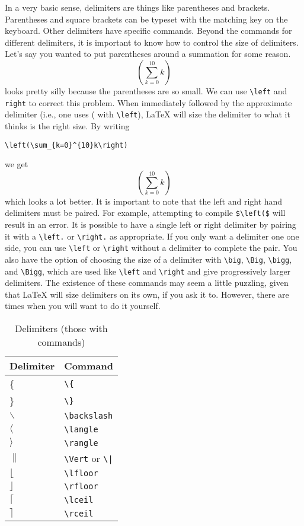 In a very basic sense, delimiters are things like parentheses and
brackets.  Parentheses and square brackets can be typeset with the
matching key on the keyboard.  Other delimiters have specific
commands.  Beyond the commands for different delimiters, it is
important to know how to control the size of delimiters.  Let's say
you wanted to put parentheses around a summation for some
reason.  \[(\sum_{k=0}^{10} k)\] looks pretty silly because the
parentheses are so small.  We can use \verb=\left= and \verb=right= to
correct this problem.  When immediately followed by the approximate
delimiter (i.e., one uses ( with \verb=\left=), \LaTeX{} will size
the delimiter to what it thinks is the right size.  By writing
\begin{verbatim}
\left(\sum_{k=0}^{10}k\right)
\end{verbatim}
we get \[\left(\sum_{k=0}^{10}k\right)\] which looks a lot better.
It is important to note that the left and right hand delimiters
must be paired.  For example, attempting to compile
\verb?$\left($? will result in an error.  It is possible to have a
single left or right delimiter by pairing it with a
\verb=\left.= or \verb=\right.= as appropriate.  If you only
want a delimiter one one side, you can use \verb=\left= or
\verb=\right= without a delimiter to complete the pair.  You
also have the option of choosing the size of a delimiter with
\verb=\big=, \verb=\Big=, \verb=\bigg=, and \verb=\Bigg=, which
are used like \verb=\left= and \verb=\right= and give
progressively larger delimiters.  The existence of these
commands may seem a little puzzling, given that \LaTeX{} will
size delimiters on its own, if you ask it to.  However, there
are times when you will want to do it yourself.
\begin{table}
  \centering
  \caption{Delimiters (those with commands)}
  \label{tab:delimiters}
  \begin{tabular}{@{}ll@{}}
    \toprule
    Delimiter & Command \\
    \midrule
    \{ & \verb=\{= \\
    \} & \verb=\}= \\
    $\backslash$ & \verb=\backslash= \\
    $\langle$ & \verb=\langle= \\
    $\rangle$ & \verb=\rangle= \\
    $\|$ & \verb?\Vert? or \verb?\|? \\
    $\lfloor$ & \verb?\lfloor? \\
    $\rfloor$ & \verb?\rfloor? \\
    $\lceil$ & \verb?\lceil? \\
    $\rceil$ & \verb?\rceil? \\
    \bottomrule
  \end{tabular}
\end{table}

